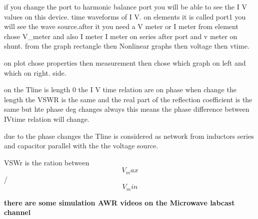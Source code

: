 \documentclass{article}
\begin{document}
if you change the port to harmonic balance port you will be able to see the 
I V values on this device. time waveforms  of I V.
on elements it is called port1
you will see the wave source.after it you need a V meter or I meter 
from element chose V_meter and also I meter 
I meter on series after port and v meter on shunt.
from the graph rectangle then Nonlinear graphs then voltage then vtime.

on plot chose properties then measurement then  chose which graph on left and which on right. side.

on the Tline is length 0  the I V time relation are on phase when change the length the VSWR is the same and the 
real part of the reflection coefficient is the same  but hte phase deg changes always
this means the phase difference between IVtime relation will change.

due to the phase changes the Tline is considered as network from inductors series and capacitor parallel
with the the voltage source.

VSWr is the ration between $$V_max$$ / $$V_min$$





\textbf{there are some simulation AWR videos on the Microwave labcast channel}
\end{document}
